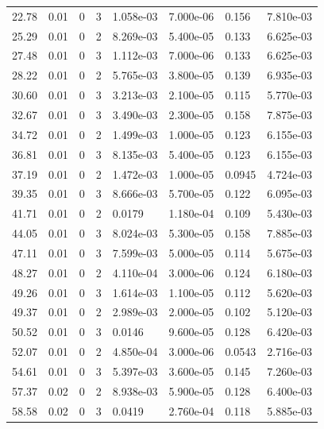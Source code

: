 \documentclass[preview]{standalone}
\begin{document}
{{\begin{tabular}{L{1.2cm}C{1.2cm} C{0.3cm}C{0.5cm} C{1.4cm}C{1.4cm} C{1.4cm}C{1.4cm}}
  22.78  &  0.01  & 0     &  3 &  1.058e-03  & 7.000e-06  & 0.156 &  7.810e-03   \\ 
  25.29  &  0.01  & 0     &  2 &  8.269e-03  & 5.400e-05  & 0.133 &  6.625e-03   \\ 
  27.48  &  0.01  & 0     &  3 &  1.112e-03  & 7.000e-06  & 0.133 &  6.625e-03   \\ 
  28.22  &  0.01  & 0     &  2 &  5.765e-03  & 3.800e-05  & 0.139 &  6.935e-03   \\ 
  30.60  &  0.01  & 0     &  3 &  3.213e-03  & 2.100e-05  & 0.115 &  5.770e-03   \\ 
  32.67  &  0.01  & 0     &  3 &  3.490e-03  & 2.300e-05  & 0.158 &  7.875e-03   \\ 
  34.72  &  0.01  & 0     &  2 &  1.499e-03  & 1.000e-05  & 0.123 &  6.155e-03   \\ 
  36.81  &  0.01  & 0     &  3 &  8.135e-03  & 5.400e-05  & 0.123 &  6.155e-03   \\ 
  37.19  &  0.01  & 0     &  2 &  1.472e-03  & 1.000e-05  & 0.0945 &  4.724e-03   \\ 
  39.35  &  0.01  & 0     &  3 &  8.666e-03  & 5.700e-05  & 0.122 &  6.095e-03   \\ 
  41.71  &  0.01  & 0     &  2 &  0.0179  & 1.180e-04  & 0.109 &  5.430e-03   \\ 
  44.05  &  0.01  & 0     &  3 &  8.024e-03  & 5.300e-05  & 0.158 &  7.885e-03   \\ 
  47.11  &  0.01  & 0     &  3 &  7.599e-03  & 5.000e-05  & 0.114 &  5.675e-03   \\ 
  48.27  &  0.01  & 0     &  2 &  4.110e-04  & 3.000e-06  & 0.124 &  6.180e-03   \\ 
  49.26  &  0.01  & 0     &  3 &  1.614e-03  & 1.100e-05  & 0.112 &  5.620e-03   \\ 
  49.37  &  0.01  & 0     &  2 &  2.989e-03  & 2.000e-05  & 0.102 &  5.120e-03   \\ 
  50.52  &  0.01  & 0     &  3 &  0.0146  & 9.600e-05  & 0.128 &  6.420e-03   \\ 
  52.07  &  0.01  & 0     &  2 &  4.850e-04  & 3.000e-06  & 0.0543 &  2.716e-03   \\ 
  54.61  &  0.01  & 0     &  3 &  5.397e-03  & 3.600e-05  & 0.145 &  7.260e-03   \\ 
  57.37  &  0.02  & 0     &  2 &  8.938e-03  & 5.900e-05  & 0.128 &  6.400e-03   \\ 
  58.58  &  0.02  & 0     &  3 &  0.0419  & 2.760e-04  & 0.118 &  5.885e-03   \\ 

\end{tabular}}}
\end{document}
